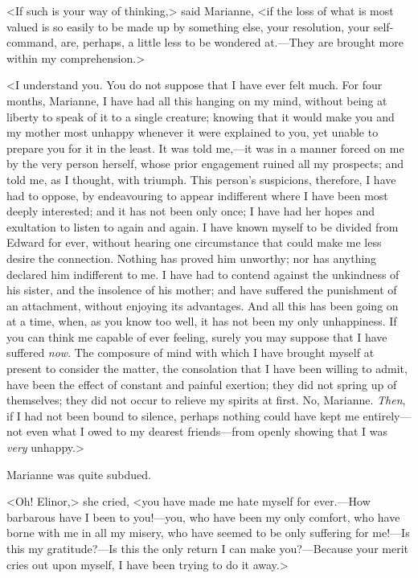 <If such is your way of thinking,> said Marianne, <if the loss of what is most valued is so easily to be made up by something else, your resolution, your self-command, are, perhaps, a little less to be wondered at.—They are brought more within my comprehension.>

<I understand you. You do not suppose that I have ever felt much. For four months, Marianne, I have had all this hanging on my mind, without being at liberty to speak of it to a single creature; knowing that it would make you and my mother most unhappy whenever it were explained to you, yet unable to prepare you for it in the least. It was told me,—it was in a manner forced on me by the very person herself, whose prior engagement ruined all my prospects; and told me, as I thought, with triumph. This person's suspicions, therefore, I have had to oppose, by endeavouring to appear indifferent where I have been most deeply interested; and it has not been only once; I have had her hopes and exultation to listen to again and again. I have known myself to be divided from Edward for ever, without hearing one circumstance that could make me less desire the connection. Nothing has proved him unworthy; nor has anything declared him indifferent to me. I have had to contend against the unkindness of his sister, and the insolence of his mother; and have suffered the punishment of an attachment, without enjoying its advantages. And all this has been going on at a time, when, as you know too well, it has not been my only unhappiness. If you can think me capable of ever feeling, surely you may suppose that I have suffered \textit{now}. The composure of mind with which I have brought myself at present to consider the matter, the consolation that I have been willing to admit, have been the effect of constant and painful exertion; they did not spring up of themselves; they did not occur to relieve my spirits at first. No, Marianne. \textit{Then}, if I had not been bound to silence, perhaps nothing could have kept me entirely—not even what I owed to my dearest friends—from openly showing that I was \textit{very} unhappy.>

Marianne was quite subdued.

<Oh! Elinor,> she cried, <you have made me hate myself for ever.—How barbarous have I been to you!—you, who have been my only comfort, who have borne with me in all my misery, who have seemed to be only suffering for me!—Is this my gratitude?—Is this the only return I can make you?—Because your merit cries out upon myself, I have been trying to do it away.>

